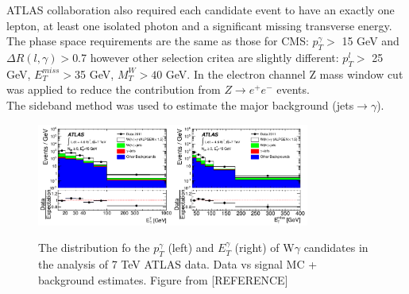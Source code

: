
ATLAS collaboration also required each candidate event to have an exactly one lepton, at least one isolated photon and a significant missing transverse energy. The phase space requirements are the same as those for CMS: $p_T^{\gamma}>$ 15 GeV and $\Delta R(l,\gamma)>$0.7 however other selection critea are slightly different: $p_T^l>$ 25 GeV, $E_T^{miss}>$35 GeV, $M_T^W>40$ GeV. In the electron channel Z mass window cut was applied to reduce the contribution from $Z\rightarrow e^+e^-$ events.\\

The sideband method was used to estimate the major background (jets$\rightarrow\gamma$). 

\begin{figure}[htb]
  \begin{center}
    {\includegraphics[width=0.80\textwidth]{../figs/WgAbout/Wg7TeV_ATLAS_ptGamma.png}}
    \caption{The distribution fo the $p_T^\gamma$ (left) and $E_T^\gamma$ (right) of W$\gamma$ candidates in the analysis of 7 TeV ATLAS data. Data vs signal MC + background estimates. Figure from [REFERENCE]}
    \label{fig:Wg7TeV_ATLAS_ptGamma}
  \end{center}
\end{figure}



